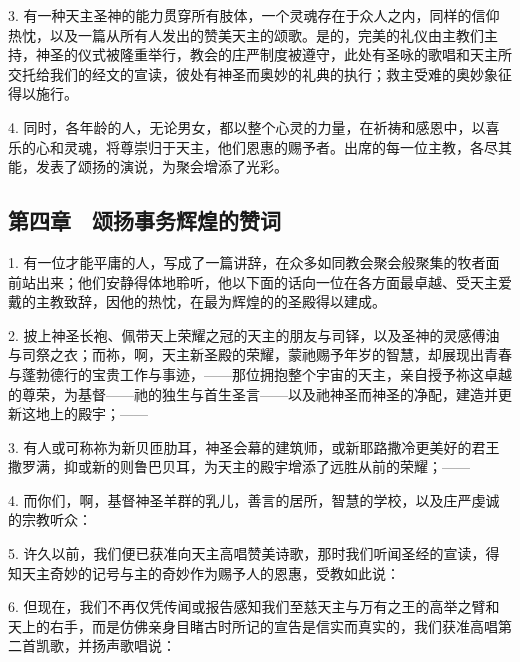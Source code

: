 3. 有一种天主圣神的能力贯穿所有肢体，一个灵魂存在于众人之内，同样的信仰热忱，以及一篇从所有人发出的赞美天主的颂歌。是的，完美的礼仪由主教们主持，神圣的仪式被隆重举行，教会的庄严制度被遵守，此处有圣咏的歌唱和天主所交托给我们的经文的宣读，彼处有神圣而奥妙的礼典的执行；救主受难的奥妙象征得以施行。\par

4. 同时，各年龄的人，无论男女，都以整个心灵的力量，在祈祷和感恩中，以喜乐的心和灵魂，将尊崇归于天主，他们恩惠的赐予者。出席的每一位主教，各尽其能，发表了颂扬的演说，为聚会增添了光彩。\par


\subsection{第四章　颂扬事务辉煌的赞词}

1. 有一位才能平庸的人，写成了一篇讲辞，在众多如同教会聚会般聚集的牧者面前站出来；他们安静得体地聆听，他以下面的话向一位在各方面最卓越、受天主爱戴的主教致辞，因他的热忱，在最为辉煌的的圣殿得以建成。\par

\par

2. 披上神圣长袍、佩带天上荣耀之冠的天主的朋友与司铎，以及圣神的灵感傅油与司祭之衣；而祢，啊，天主新圣殿的荣耀，蒙祂赐予年岁的智慧，却展现出青春与蓬勃德行的宝贵工作与事迹，——那位拥抱整个宇宙的天主，亲自授予祢这卓越的尊荣，为基督——祂的独生与首生圣言——以及祂神圣而神圣的净配，建造并更新这地上的殿宇；——\par

3. 有人或可称祢为新贝匝肋耳，神圣会幕的建筑师，或新耶路撒冷更美好的君王撒罗满，抑或新的则鲁巴贝耳，为天主的殿宇增添了远胜从前的荣耀；——\par

4. 而你们，啊，基督神圣羊群的乳儿，善言的居所，智慧的学校，以及庄严虔诚的宗教听众：\par

5. 许久以前，我们便已获准向天主高唱赞美诗歌，那时我们听闻圣经的宣读，得知天主奇妙的记号与主的奇妙作为赐予人的恩惠，受教如此说：\par

6. 但现在，我们不再仅凭传闻或报告感知我们至慈天主与万有之王的高举之臂和天上的右手，而是仿佛亲身目睹古时所记的宣告是信实而真实的，我们获准高唱第二首凯歌，并扬声歌唱说：\par

